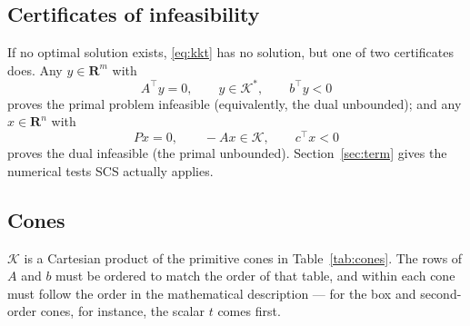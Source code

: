 \documentclass[11pt,a4paper]{article}
\newcommand{\R}{\mathbf{R}}
\newcommand{\K}{\mathcal{K}}
\newcommand{\tr}{^\top}
\theoremstyle{plain}
\begin{document}
\subsection{Certificates of infeasibility}

If no optimal solution exists, \eqref{eq:kkt} has no solution, but one of two
certificates does. Any $y \in \R^m$ with
\begin{equation}\label{eq:pinfeas}
A\tr y = 0,\qquad y \in \K^*,\qquad b\tr y < 0
\end{equation}
proves the primal problem infeasible (equivalently, the dual unbounded); and
any $x \in \R^n$ with
\begin{equation}\label{eq:dinfeas}
Px = 0,\qquad -Ax \in \K,\qquad c\tr x < 0
\end{equation}
proves the dual infeasible (the primal unbounded). Section~\ref{sec:term} gives
the numerical tests SCS actually applies.

\subsection{Cones}\label{sec:cones}

$\K$ is a Cartesian product of the primitive cones in
Table~\ref{tab:cones}. The rows of $A$ and $b$ must be ordered to match the
order of that table, and within each cone must follow the order in the
mathematical description --- for the box and second-order cones, for instance,
the scalar $t$ comes first.
\end{document}
